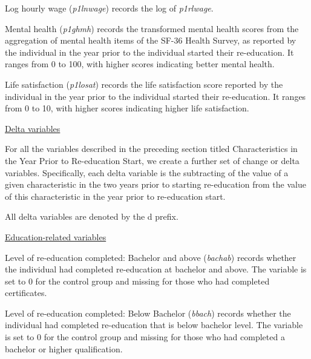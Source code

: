 \documentclass[12pt, a4paper]{article}
\begin{document}
Log hourly wage (\textit{p1\textunderscore{}lnwage}) records the log of  \textit{p1\textunderscore{}rlwage}. 

Mental health (\textit{p1\textunderscore{}ghmh}) records the transformed mental health scores from the aggregation of mental health items of the SF-36 Health Survey, as reported by the individual in the year prior to the individual started their re-education. It ranges from 0 to 100, with higher scores indicating better mental health.   

Life satisfaction (\textit{p1\textunderscore{}losat}) records the life satisfaction score reported by the individual in the year prior to the individual started their re-education. It ranges from 0 to 10, with higher scores indicating higher life satisfaction. 

\underline{Delta variables}

For all the variables described in the preceding section titled Characteristics in the Year Prior to Re-education Start, we create a further set of change or delta variables. Specifically, each delta variable is the subtracting of the value of a given characteristic in the two years prior to starting re-education from the value of this characteristic in the year prior to re-education start. 

All delta variables are denoted by the d\textunderscore{} prefix. 

\underline{Education-related variables}

Level of re-education completed: Bachelor and above (\textit{bachab}) records whether the individual had completed re-education at bachelor and above. The variable is set to 0 for the control group and missing for those who had completed certificates. 

Level of re-education completed: Below Bachelor (\textit{bbach}) records whether the individual had completed re-education that is below bachelor level. The variable is set to 0 for the control group and missing for those who had completed a bachelor or higher qualification. 
\end{document}
